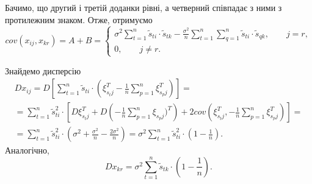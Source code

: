 Бачимо, що другий і третій доданки рівні,
а четверний співпадає з ними з протилежним знаком.
Отже, отримуємо
\begin{equation*}
  cov \left( x_{ij}, x_{kr} \right) =
  A + B =
  \begin{cases}
    \sigma^2 \sum \limits_{t=1}^n \tilde{s}_{ti} \cdot \tilde{s}_{tk} -
    \frac{\sigma^2}{n} \sum \limits_{t=1}^n
      \sum \limits_{q=1}^n \tilde{s}_{ti} \cdot \tilde{s}_{qk}, \qquad j = r, \\
    0, \qquad j \neq r.
  \end{cases}
\end{equation*}

Знайдемо дисперсію
\begin{equation*}
  \begin{gathered}
    Dx_{ij} =
    D \left[
      \sum \limits_{t=1}^n \tilde{s}_{ti} \cdot \left(
        \xi_{s_t j}^T - \frac{1}{n} \sum \limits_{p=1}^n \xi_{s_p j}^T
      \right) \right] = \\
    = \sum \limits_{t=1}^n \tilde{s}_{ti}^2 \cdot \left[ D \xi_{s_t j}^T + D \left(
      -\frac{1}{n} \sum \limits_{p=1}^n
        \xi_{s_p j})^T \right) + 2cov \left( \xi_{s_t j}^T,
      -\frac{1}{n} \sum \limits_{p=1}^n \xi_{s_p j}^T
    \right) \right] = \\
    = \sum \limits_{t=1}^n \tilde{s}_{ti}^2 \cdot \left(
      \sigma^2 + \frac{\sigma^2}{n} - \frac{2 \sigma^2}{n}
    \right) =
    \sigma^2 \sum \limits_{t=1}^n \tilde{s}_{ti}^2 \cdot
    \left( 1 - \frac{1}{n} \right).
  \end{gathered}
\end{equation*}
Аналогічно,
\begin{equation*}
  Dx_{kr} =
  \sigma^2 \sum \limits_{t=1}^n
    \tilde{s}_{tk} \cdot \left( 1 - \frac{1}{n} \right).
\end{equation*}

